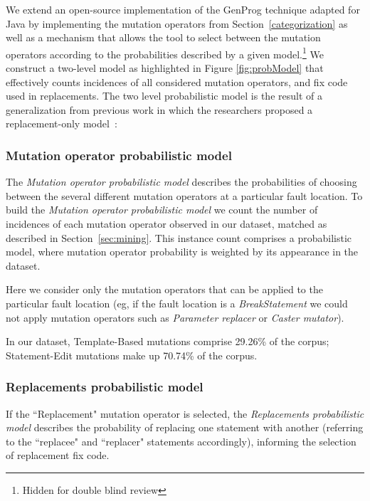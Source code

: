 \documentclass[conference]{IEEEtran}
\begin{document}
We extend an open-source implementation of the GenProg technique adapted for Java
by implementing the mutation operators from
Section~\ref{categorization} as well as a mechanism that allows the tool to
select between the mutation operators according to the probabilities described by
a given model.\footnote{Hidden for double blind review} %
We construct a two-level model as highlighted in Figure \ref{fig:probModel} that effectively counts incidences of all considered
mutation operators, and fix code used in replacements. The two level probabilistic model is the result of a generalization from previous work in which the researchers proposed a replacement-only model~\cite{Soto16}:

\subsubsection{Mutation operator probabilistic model}
The \textit{Mutation operator probabilistic model} 
describes the probabilities of choosing between the several different mutation 
operators at a particular fault location.
%
To build the \textit{Mutation operator probabilistic model} 
we count the number of incidences of each mutation operator observed in our
dataset, matched as described in Section~\ref{sec:mining}. This
instance count comprises a probabilistic model, where mutation operator probability is
weighted by its appearance in the dataset.  

Here we consider only the mutation operators that can be applied to the particular fault location (eg, if the fault location is a \emph{BreakStatement} we could not apply mutation operators such as \emph{Parameter replacer} or \emph{Caster mutator}).

In our dataset, Template-Based mutations comprise 29.26\% of the corpus; Statement-Edit mutations make up 70.74\% of the 
corpus.

\subsubsection{Replacements probabilistic model}
If the ``Replacement" mutation operator is 
selected, the \textit{Replacements probabilistic model} describes the probability of replacing one statement with
another  (referring to the 
``replacee" and ``replacer" statements accordingly), informing the selection of replacement fix code.
\end{document}
